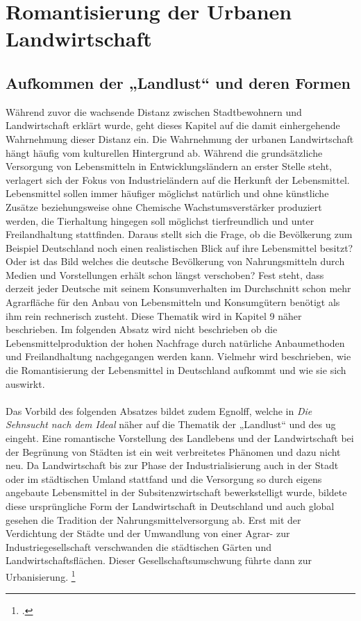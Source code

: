 \documentclass{scrartcl}
\begin{document}
\section{Romantisierung der Urbanen Landwirtschaft}

\subsection{Aufkommen der „Landlust“ und deren Formen}

Während zuvor die wachsende Distanz zwischen Stadtbewohnern und Landwirtschaft erklärt wurde, geht dieses Kapitel auf die damit einhergehende Wahrnehmung dieser Distanz ein. Die Wahrnehmung der urbanen Landwirtschaft hängt häufig vom kulturellen Hintergrund ab. Während die grundsätzliche Versorgung von Lebensmitteln in Entwicklungsländern an erster Stelle steht, verlagert sich der Fokus von Industrieländern auf die Herkunft der Lebensmittel. Lebensmittel sollen immer häufiger möglichst natürlich und ohne künstliche Zusätze beziehungsweise ohne Chemische Wachstumsverstärker produziert werden, die Tierhaltung hingegen soll möglichst tierfreundlich und unter Freilandhaltung stattfinden. Daraus stellt sich die Frage, ob die Bevölkerung zum Beispiel Deutschland noch einen realistischen Blick auf ihre Lebensmittel besitzt? Oder ist das Bild welches die deutsche Bevölkerung von Nahrungsmitteln durch Medien und Vorstellungen erhält schon längst verschoben? Fest steht, dass derzeit jeder Deutsche mit seinem Konsumverhalten im Durchschnitt schon mehr Agrarfläche für den Anbau von Lebensmitteln und Konsumgütern benötigt als ihm rein rechnerisch zusteht. Diese Thematik wird in Kapitel 9 näher beschrieben. Im folgenden Absatz wird nicht beschrieben ob die Lebensmittelproduktion der hohen Nachfrage durch natürliche Anbaumethoden und Freilandhaltung nachgegangen werden kann. Vielmehr wird beschrieben, wie die Romantisierung der Lebensmittel in Deutschland aufkommt und wie sie sich auswirkt.\\
\\
Das Vorbild des folgenden Absatzes bildet zudem Egnolff, welche in \textit{Die Sehnsucht nach dem Ideal} näher auf die Thematik der „Landlust“ und des \acs{ug} eingeht. Eine romantische Vorstellung des Landlebens und der Landwirtschaft bei der Begrünung von Städten ist ein weit verbreitetes Phänomen und dazu nicht neu. Da Landwirtschaft bis zur Phase der Industrialisierung auch in der Stadt oder im städtischen Umland stattfand und die Versorgung so durch eigens angebaute Lebensmittel in der Subsitenzwirtschaft bewerkstelligt wurde, bildete diese ursprüngliche Form der Landwirtschaft in Deutschland und auch global gesehen die Tradition der Nahrungsmittelversorgung ab. Erst mit der Verdichtung der Städte und der Umwandlung von einer Agrar- zur Industriegesellschaft verschwanden die städtischen Gärten und Landwirtschaftsflächen. Dieser Gesellschaftsumschwung führte dann zur Urbanisierung. \footcite[Vgl.][S. 32ff]{Egnolff2015DieIdeal}\\
\end{document}

